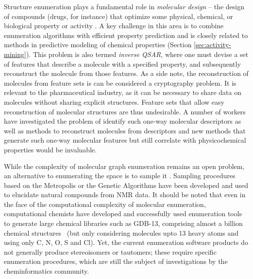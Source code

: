 \documentclass{sig-alternate}
\begin{document}
Structure enumeration plays a fundamental role in \emph{molecular
  design} -- the design of compounds (drugs, for instance) that
optimize some physical, chemical, or biological property or activity
\cite{Schneider:2005uq}. A key challenge in this area is to combine
enumeration algorithms with efficient property prediction and is
closely related to methods in predictive modeling of chemical
properties (Section \ref{sec:activity-mining}). This problem is also
termed \emph{inverse QSAR}, where one must devise a set of features
that describe a molecule with a specified property, and subsequently
reconstruct the molecule from those features. As a side note, the
reconstruction of molecules from feature sets is can be considered a
cryptography problem. It is relevant to the pharmaceutical industry,
as it can be necessary to share data on molecules without sharing
explicit structures. Feature sets that allow easy reconstruction of
molecular structures are thus undesirable. A number of workers have
investigated the problem of identify such one-way molecular
descriptors as well as methods to reconstruct molecules from
descriptors \cite{Masek:2008kx} and new methods that generate such
one-way molecular features but still correlate with physicochemical
properties would be invaluable.

While the complexity of molecular graph enumeration remains an open
problem, an alternative to enumerating the space is to sample it
\cite{goldberg1999}. Sampling procedures based on the Metropolis or
the Genetic Algorithms have been developed and used to elucidate
natural compounds from NMR data. It should be noted that even in the
face of the computational complexity of molecular enumeration,
computational chemists have developed and successfully used
enumeration tools to generate large chemical libraries such as GDB-13,
comprising almost a billion chemical structures~\cite{GDB} (but only
considering molecules upto 13 heavy atoms and using only C, N, O, S
and Cl). Yet, the current enumeration software products do not
generally produce stereoisomers or tautomers; these require specific
enumeration procedures, which are still the subject of investigations
by the cheminformatics community.
\end{document}
